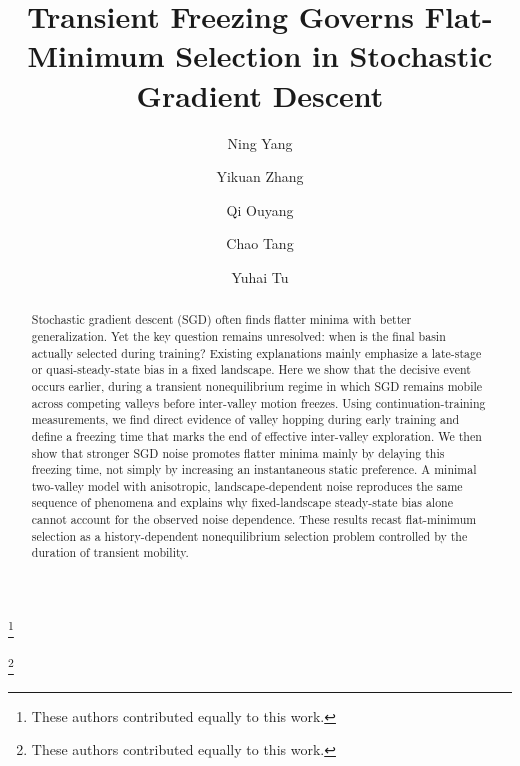 \documentclass[aps,prx,reprint,superscriptaddress,longbibliography,nofootinbib,floatfix]{revtex4-2}
\begin{document}
\title{Transient Freezing Governs Flat-Minimum Selection in Stochastic Gradient Descent}

\author{Ning Yang}
\thanks{These authors contributed equally to this work.}

\author{Yikuan Zhang}
\thanks{These authors contributed equally to this work.}

\author{Qi Ouyang}

\author{Chao Tang}

\author{Yuhai Tu}

\begin{abstract}
Stochastic gradient descent (SGD) often finds flatter minima with better generalization. Yet the key question remains unresolved: when is the final basin actually selected during training? Existing explanations mainly emphasize a late-stage or quasi-steady-state bias in a fixed landscape. Here we show that the decisive event occurs earlier, during a transient nonequilibrium regime in which SGD remains mobile across competing valleys before inter-valley motion freezes. Using continuation-training measurements, we find direct evidence of valley hopping during early training and define a freezing time that marks the end of effective inter-valley exploration. We then show that stronger SGD noise promotes flatter minima mainly by delaying this freezing time, not simply by increasing an instantaneous static preference. A minimal two-valley model with anisotropic, landscape-dependent noise reproduces the same sequence of phenomena and explains why fixed-landscape steady-state bias alone cannot account for the observed noise dependence. These results recast flat-minimum selection as a history-dependent nonequilibrium selection problem controlled by the duration of transient mobility.
\end{abstract}

\maketitle
\end{document}
